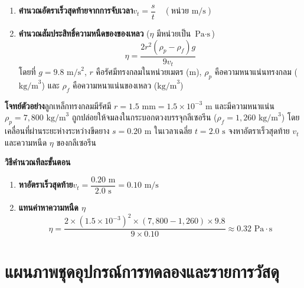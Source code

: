 \begin{conceptbox}
\begin{enumerate}
    \item \textbf{คำนวณอัตราเร็วสุดท้ายจากการจับเวลา}\quad $v_t = \dfrac{s}{t}\quad (\text{หน่วย m/s})$
    \item \textbf{คำนวณสัมประสิทธิ์ความหนืดของของเหลว} ($\eta$ มีหน่วยเป็น $\text{Pa}\cdot\text{s}$)
    \begin{equation}
        \eta = \frac{2 r^2 (\rho_p - \rho_f) g}{9 v_t}
    \end{equation}
    โดยที่ $g = 9.8\text{ m/s}^2$, $r$ คือรัศมีทรงกลมในหน่วยเมตร ($\text{m}$), $\rho_p$ คือความหนาแน่นทรงกลม ($\text{kg/m}^3$) และ $\rho_f$ คือความหนาแน่นของเหลว ($\text{kg/m}^3$)
\end{enumerate}
\end{conceptbox}

\begin{worked}
\textbf{โจทย์ตัวอย่าง}\quad ลูกเหล็กทรงกลมมีรัศมี $r = 1.5\text{ mm} = 1.5 \times 10^{-3}\text{ m}$ และมีความหนาแน่น $\rho_p = 7{,}800\text{ kg/m}^3$ ถูกปล่อยให้จมลงในกระบอกตวงบรรจุกลีเซอรีน ($\rho_f = 1{,}260\text{ kg/m}^3$) โดยเคลื่อนที่ผ่านระยะห่างระหว่างขีดยาง $s = 0.20\text{ m}$ ในเวลาเฉลี่ย $t = 2.0\text{ s}$ จงหาอัตราเร็วสุดท้าย $v_t$ และความหนืด $\eta$ ของกลีเซอรีน

\textbf{วิธีคำนวณทีละขั้นตอน}
\begin{enumerate}
    \item \textbf{หาอัตราเร็วสุดท้าย}\quad $v_t = \dfrac{0.20\text{ m}}{2.0\text{ s}} = 0.10\text{ m/s}$
    \item \textbf{แทนค่าหาความหนืด $\eta$}
    \[
        \eta = \frac{2 \times (1.5 \times 10^{-3})^2 \times (7{,}800 - 1{,}260) \times 9.8}{9 \times 0.10} \approx 0.32\text{ Pa}\cdot\text{s}
    \]
\end{enumerate}
\end{worked}

\section{แผนภาพชุดอุปกรณ์การทดลองและรายการวัสดุ}

